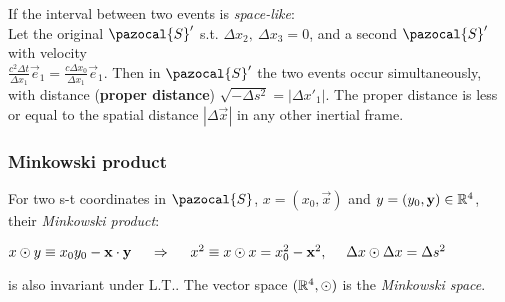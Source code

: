 If the interval between two events is \emph{space-like}:\\
Let the original $\pazocal{S}'$ s.t. $\Delta x_{2},\ \Delta x_{3}=0$, and a second $\pazocal{S}'$ with velocity\\ $\frac{c^{2}\Delta t}{\Delta x_{1}}\vec{e}_{1}=\frac{c \Delta x_{0}}{\Delta x_{1}}\vec{e}_{1}$. Then in $\pazocal{S}'$ the two events occur simultaneously, with distance (\textbf{proper distance}) $\sqrt{-\Delta s^{2}}=|\Delta x'_{1}|$. The proper distance is less or equal to the spatial distance $|\Delta \vec{x}|$ in any other inertial frame.
\smallskip
\subsubsection*{Minkowski product}
For two s-t coordinates in $\pazocal{S}$, $x=(x_{0},\vec{x})$ and $y=(y_{0},\mathbf{y})\in\mathbb{R}^{4}$, their \emph{Minkowski product}:\\
\centerline{$x\odot y\equiv x_{0}y_{0}-\vec{x}\cdot \vec{y}\ \ \ \ \then\ \ \ \ x^{2}\equiv x\odot x=x_{0}^{2}-\vec{x}^{2},\ \ \ \ \Delta x\odot\Delta x=\Delta s^{2}$}
is also invariant under L.T.. The vector space $(\mathbb{R}^{4},\odot)$ is the \emph{Minkowski space}.\\


